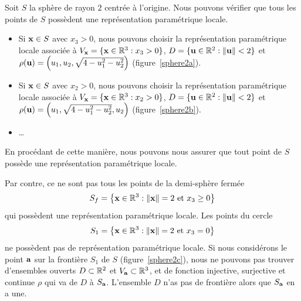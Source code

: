 {\begin{egg}
Soit $S$ la sphère de rayon $2$ centrée à l'origine.  Nous pouvons
vérifier que tous les points de $S$ possèdent une représentation paramétrique
locale.
\begin{itemize}
\item Si $\mathbf{x} \in S$ avec $x_3>0$, nous pouvons choisir la
représentation paramétrique locale associée à
$V_{\mathbf{x}} = \{ \mathbf{x} \in \mathbb{R}^3 : x_3 >0\}$,
$D = \{ \mathbf{u} \in \mathbb{R}^2 : \|\mathbf{u}\| < 2\}$ et
$\rho(\mathbf{u}) = \left(u_1,u_2,\sqrt{4-u_1^2-u_2^2}\right)$
(figure~\ref{sphere2a}).
\item Si $\mathbf{x} \in S$ avec $x_2>0$, nous
pouvons choisir la représentation paramétrique locale associée à
$V_{\mathbf{x}} = \{ \mathbf{x} \in \mathbb{R}^3 : x_2 >0\}$,
$D = \{ \mathbf{u} \in \mathbb{R}^2 : \|\mathbf{u}\| < 2\}$ et
$\rho(\mathbf{u}) = \left(u_1,\sqrt{4-u_1^2-u_2^2},u_2\right)$
(figure~\ref{sphere2b}).
\item \ldots
\end{itemize}
En procédant de cette manière, nous pouvons nous assurer que tout point de
$S$ possède une représentation paramétrique locale.
\label{sphereRPL}
\end{egg}



\begin{egg}
Par contre, ce ne sont pas tous les points de la demi-sphère fermée
\[
S_f= \left\{ \mathbf{x} \in \mathbb{R}^3 : \| \mathbf{x} \| = 2 \ \text{et} \ x_3 \geq 0
\right\}
\]
qui possèdent une représentation paramétrique locale.  Les points du cercle
\[
S_1 = \left\{ \mathbf{x} \in \mathbb{R}^3 : \| \mathbf{x} \| = 2 \ \text{et} \ x_3=0
\right\}
\]
ne possèdent pas de représentation paramétrique locale.  Si nous
considérons le point $\mathbf{a}$ sur la frontière $S_1$ de $S$
(figure~\ref{sphere2c}), nous ne pouvons pas trouver 
d'ensembles ouverts $D\subset \mathbb{R}^2$ et $V_{\mathbf{a}} \subset \mathbb{R}^3$,
et de fonction injective, surjective et continue $\rho$ qui va de $D$
à $S_{\mathbf{a}}$.  L'ensemble $D$ n'as pas de frontière alors que
$S_{\mathbf{a}}$ en a une.
\label{SphereAvecBord}
\end{egg}

}
